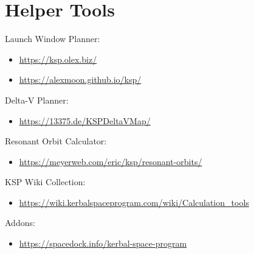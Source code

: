 \documentclass[12pt,paper=A4,numbers=noenddot,bibliography=totoc,listof=totoc,DIV=11,BCOR=1mm]{scrreprt}
\begin{document}
\thispagestyle{empty}
\vspace*{-4cm}
\noindent{}

\section*{Helper Tools}
Launch Window Planner:
\begin{itemize}
  \item \url{https://ksp.olex.biz/}
  \item \url{https://alexmoon.github.io/ksp/}
\end{itemize}
Delta-V Planner:
\begin{itemize}
\item \url{https://13375.de/KSPDeltaVMap/}
\end{itemize}
Resonant Orbit Calculator:
\begin{itemize}
  \item \url{https://meyerweb.com/eric/ksp/resonant-orbits/}
\end{itemize}
KSP Wiki Collection:
\begin{itemize}
\item \url{https://wiki.kerbalspaceprogram.com/wiki/Calculation_tools}
\end{itemize}
Addons:
\begin{itemize}
\item \url{https://spacedock.info/kerbal-space-program}
\end{itemize}
\end{document}
